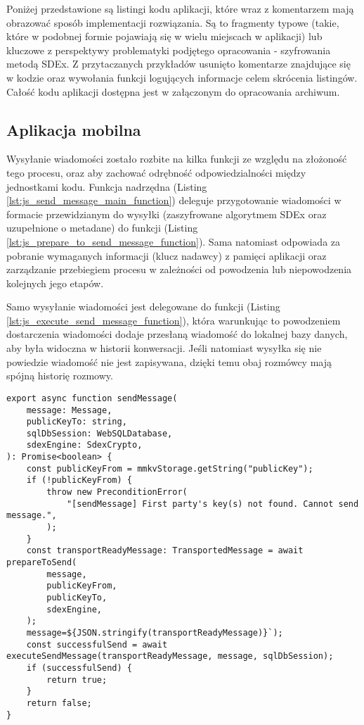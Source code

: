 \documentclass[../main.tex]{subfiles}
\begin{document}
Poniżej przedstawione są listingi kodu aplikacji, które wraz z komentarzem mają obrazować sposób implementacji rozwiązania. Są to fragmenty typowe (takie, które w podobnej formie pojawiają się w wielu miejscach w aplikacji) lub kluczowe z perspektywy problematyki podjętego opracowania - szyfrowania metodą SDEx. Z przytaczanych przykładów usunięto komentarze znajdujące się w kodzie oraz wywołania funkcji logujących informacje celem skrócenia listingów. Całość kodu aplikacji dostępna jest w załączonym do opracowania archiwum.

\subsection{Aplikacja mobilna}

Wysyłanie wiadomości zostało rozbite na kilka funkcji ze względu na złożoność tego procesu, oraz aby zachować odrębność odpowiedzialności między jednostkami kodu. Funkcja nadrzędna (Listing \ref{lst:js_send_message_main_function}) deleguje przygotowanie wiadomości w formacie przewidzianym do wysyłki (zaszyfrowane algorytmem SDEx oraz uzupełnione o metadane) do funkcji  (Listing \ref{lst:js_prepare_to_send_message_function}). Sama natomiast odpowiada za pobranie wymaganych informacji (klucz nadawcy) z pamięci aplikacji oraz zarządzanie przebiegiem procesu w zależności od powodzenia lub niepowodzenia kolejnych jego etapów.

Samo wysyłanie wiadomości jest delegowane do funkcji  (Listing \ref{lst:js_execute_send_message_function}), która warunkując to powodzeniem dostarczenia wiadomości dodaje przesłaną wiadomość do lokalnej bazy danych, aby była widoczna w historii konwersacji. Jeśli natomiast wysyłka się nie powiedzie wiadomość nie jest zapisywana, dzięki temu obaj rozmówcy mają spójną historię rozmowy.

\begin{lstlisting}[caption={Wysyłanie wiadomości - funkcja nadrzędna},label={lst:js_send_message_main_function}]
export async function sendMessage(
    message: Message,
    publicKeyTo: string,
    sqlDbSession: WebSQLDatabase,
    sdexEngine: SdexCrypto,
): Promise<boolean> {
    const publicKeyFrom = mmkvStorage.getString("publicKey");
    if (!publicKeyFrom) {
        throw new PreconditionError(
            "[sendMessage] First party's key(s) not found. Cannot send message.",
        );
    }
    const transportReadyMessage: TransportedMessage = await prepareToSend(
        message,
        publicKeyFrom,
        publicKeyTo,
        sdexEngine,
    );
    message=${JSON.stringify(transportReadyMessage)}`);
    const successfulSend = await executeSendMessage(transportReadyMessage, message, sqlDbSession);
    if (successfulSend) {
        return true;
    }
    return false;
}
\end{lstlisting}
\end{document}
